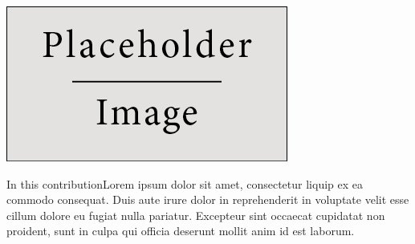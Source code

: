 \documentclass[a0,portrait]{a0poster}
\begin{document}
\begin{minipage}[c]{\linewidth}
\begin{framed}
\begin{multicols}{2}
\begin{center}
\includegraphics[trim={0 0.9cm 0 0},clip,width=0.49\linewidth]{figures/placeholder}
\label{IGSMap}
\end{center}
In this contributionLorem ipsum dolor sit amet, consectetur liquip ex ea commodo consequat. Duis aute irure dolor in reprehenderit in voluptate velit esse cillum dolore eu fugiat nulla pariatur. Excepteur sint occaecat cupidatat non proident, sunt in culpa qui officia deserunt mollit anim id est laborum.
\color{Black}

\end{multicols}
\end{framed}
\end{minipage}
\end{document}
